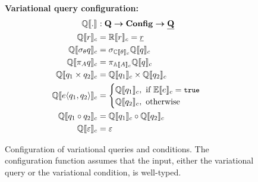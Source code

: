 \begin{figure}
\medskip
\textbf{Variational query configuration:}
\begin{alignat*}{1}
\eeSem [] . &: \qSet \totype \confSet \totype \pQSet\\
%
\eeSem \vRel &= \orSem \vRel = \pRel\\
\eeSem {\vSel \vQ}  &= \vSel [\ecSem \vCond] {\eeSem \vQ}\\
%
\eeSem {\vPrj [\vAttList] \vQ} &= \vPrj [\olSem \vAttList] {\eeSem \vQ}\\
%
%
\eeSem {{\vQ_1} \times {\vQ_2}} &= \eeSem {\vQ_1} \times \eeSem {\vQ_2}\\
%
%
\eeSem {\chc {\vQ_1, \vQ_2}} &= 
	\begin{cases}
		\eeSem {\vQ_1}, \text{ if } \fSem \dimMeta = \t\\
		\eeSem {\vQ_2}, \text{ otherwise}
	\end{cases}\\
%
\eeSem {{\vQ_1} \circ {\vQ_2}} &= \eeSem {\vQ_1} \circ \eeSem {\vQ_2}\\
%
\eeSem {\empRel} &= \empPRel
\end{alignat*}
\caption[Configuration of variational queries and conditions]{Configuration of variational queries and conditions. 
The configuration function assumes that the input, either the variational query or the variational condition,
is well-typed. 
}
\label{fig:v-alg-conf-sem}
\end{figure}

